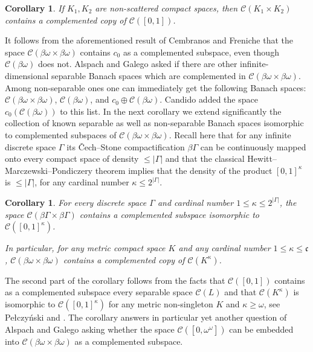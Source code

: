 \documentclass[12pt,fleqn]{amsart}
\numberwithin{equation}{section}
\newtheorem{cor}[thm]{Corollary}
\theoremstyle{definition}
\def\C{\mathcal C}
\newcommand{\bobo}{\beta\omega\times\beta\omega}
\newcommand{\con}{\mathfrak c}
\begin{document}
\begin{cor}\label{nonscattered}
If $K_1, K_2$ are non-scattered compact spaces, then $\C(K_1\times K_2)$ contains a complemented copy of $\C([0,1])$.
\end{cor} 

It follows from the aforementioned result of Cembranos and Freniche that the space $\C(\bobo)$ contains $c_0$ as a complemented subspace, even though $\C(\beta\omega)$ does not. Alspach and Galego \cite[Problem 6.4]{AG} asked if there are
other infinite-dimensional separable Banach spaces which are complemented in $\C(\bobo)$. Among non-separable ones one can immediately get the following Banach spaces: $\C(\bobo)$, $\C(\beta\omega)$, and $c_0\oplus \C(\beta\omega)$. Candido \cite[Remark 3.7]{Ca23} added the space $c_0(\C(\beta\omega))$ to this list. In the next corollary we extend significantly the collection of known separable as well as non-separable Banach spaces isomorphic to complemented subspaces of $\C(\bobo)$. %
Recall here that for any infinite discrete space $\Gamma$ its \v{C}ech--Stone compactification $\beta\Gamma$ can be continuously mapped onto every compact space of density $\le|\Gamma|$ and that the classical Hewitt--Marczewski--Pondiczery theorem implies that the density of the product $[0,1]^{\kappa}$ is $\le|\Gamma|$, for any cardinal number $\kappa\le2^{|\Gamma|}$.
 
\begin{cor}\label{cor:bobo}
For every discrete space $\Gamma$ and cardinal number $1\le\kappa\le2^{|\Gamma|}$, the space $\C(\beta\Gamma\times\beta\Gamma)$ contains a complemented subspace isomorphic to $\C([0,1]^\kappa)$. 

In particular, for any metric compact space $K$ and any cardinal number $1\le\kappa\le\con$, $\C(\bobo)$ contains a complemented copy of $\C(K^\kappa)$.
\end{cor}

The second part of the corollary follows from the facts that $\C([0,1])$ contains as a complemented subspace every separable space $\C(L)$ and that $\C(K^\kappa)$ is isomorphic to $\C([0,1]^\kappa)$ for any metric non-singleton $K$ and $\kappa\ge\omega$, see Pe\l czy\'{n}ski \cite{Pel68} and \cite[Theorem 8.8]{Pe68}. The corollary answers in particular yet another question of Alspach and Galego \cite[Problem 6.5]{AG} asking whether the space $\C([0,\omega^\omega])$ can be embedded into $\C(\bobo)$ as a complemented subspace.
\end{document}
